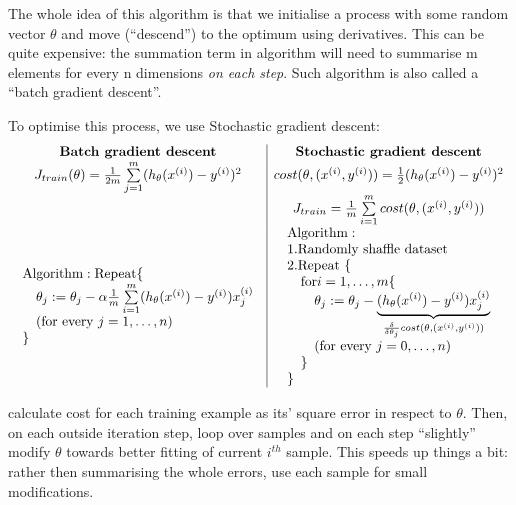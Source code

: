 \documentclass{scrartcl}
\begin{document}
The whole idea of this algorithm is that we initialise a process with
some random vector $\theta$ and move (``descend'') to the optimum
using derivatives. This can be quite expensive: the summation term in
algorithm will need to summarise m elements for every n dimensions
{\it on each step}. Such algorithm is also called a ``batch gradient
descent''.

To optimise this process, we use Stochastic gradient descent:
\[
\begin{array}{c|c}
  \textnormal{\bf Batch gradient descent} & \textnormal{\bf Stochastic gradient descent}
  \\
  J_{train}(\theta) = \frac{1}{2m}\sum
  \limits_{j=1}^m(h_\theta(x^{(i)}) - y^{(i)})^2 & cost(\theta, 
  (x^{(i)}, y^{(i)})) = \frac{1}{2} (h_\theta(x^{(i)}) - y^{(i)})^2 \\ 
  \quad & J_{train}= \frac{1}{m} \sum \limits_{i=1}^m cost(\theta,
  (x^{(i)}, y^{(i)})) \\
  \begin{array}{l}
    \mathrm{ Algorithm: Repeat } \{ \\
    \quad  \theta_j := \theta_j - \alpha \frac{1}{m} \sum
    \limits_{i=1}^m(h_\theta(x^{(i)}) - y^{(i)})x_j^{(i)} \\
    \quad  (\textnormal{for every } j = 1, \dots, n) \\
    \}
  \end{array} 
  & 
  \begin{array}{l}
    \mathrm{ Algorithm:}  \\
    1. \textnormal{Randomly shaffle dataset}  \\
    2. \textnormal{Repeat } \{ \\
    \quad \mathrm{for } i = 1, \dots, m \{ \\
    \quad \quad \theta_j := \theta_j - \underbrace{(h_\theta(x^{(i)}) -
      y^{(i)})x_j^{(i)}}_{ \frac{\delta}{\delta\theta_j} cost(\theta,
      (x^{(i)}, y^{(i)}))} \\ 
    \quad \quad (\textnormal{for every } j = 0, \dots, n) \\
    \quad \}\\
    \}
  \end{array} 
\end{array}
\]

calculate cost for each training example as its' square error in
respect to $\theta$. Then, on each outside iteration step, loop over
samples and on each step ``slightly'' modify $\theta$ towards better
fitting of current $i^{th}$ sample. This speeds up things a bit:
rather then summarising the whole errors, use each sample for small
modifications.
\end{document}
